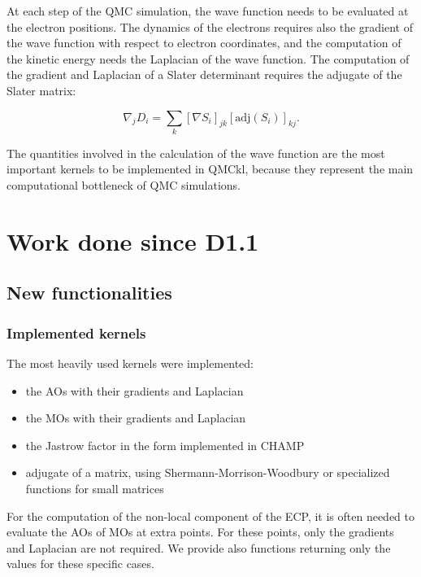At each step of the \ac{QMC} simulation, the wave function needs to be
evaluated at the electron positions. The dynamics of the electrons
requires also the gradient of the wave function with respect to electron
coordinates, and the computation of the kinetic energy needs the Laplacian
of the wave function. The computation of the gradient and Laplacian of
a Slater determinant requires the adjugate of the Slater matrix:

\begin{equation}
  \nabla_j D_i = \sum_k \left[\nabla S_i \right]_{jk} \left[\mathrm{adj}(S_i)\right]_{kj}.
\end{equation}


The quantities involved in the calculation of the wave function are the most
important kernels to be implemented in QMCkl, because they represent the main
computational bottleneck of \ac{QMC} simulations.


\section{Work done since D1.1}

\subsection{New functionalities}

\subsubsection{Implemented kernels}

The most heavily used kernels were implemented:
\begin{itemize}
  \item the \acp{AO} with their gradients and Laplacian
  \item the \acp{MO} with their gradients and Laplacian
  \item the Jastrow factor in the form implemented in CHAMP
  \item adjugate of a matrix, using Shermann-Morrison-Woodbury or
    specialized functions for small matrices
\end{itemize}    

For the computation of the non-local component of the
\ac{ECP}, it is often needed to evaluate the \acp{AO} of
\acp{MO} at extra points. For these points, only the gradients and
Laplacian are not required. We provide also functions returning only
the values for these specific cases.


